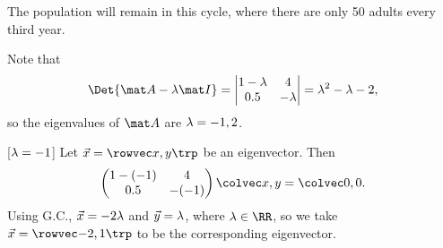 \begin{solution}
\begin{ppart}
\begin{psubpart}
        \end{psubpart}
        \begin{psubpart}
            The population will remain in this cycle, where there are only 50 adults every third year.
        \end{psubpart}
    \end{ppart}
    \begin{ppart}
        \begin{psubpart}
            Note that \[\Det{\mat A - \l \mat I} = \begin{vmatrix}1 - \l & 4 \\ 0.5 & -\l\end{vmatrix} = \l^2 - \l - 2,\] so the eigenvalues of $\mat A$ are $\lambda = -1, 2$.

            [$\lambda = -1$] Let $\vec x = \cveciix{x}{y}$ be an eigenvector. Then \[\begin{pmatrix}1-(-1) & 4 \\ 0.5 & -(-1)\end{pmatrix} \cvecii{x}{y} = \cvecii00.\] Using G.C., $\vec x = -2\lambda$ and $\vec y = \lambda$, where $\l \in \RR$, so we take $\vec x = \cveciix{-2}{1}$ to be the corresponding eigenvector.


\end{psubpart}
\end{ppart}
\end{solution}
